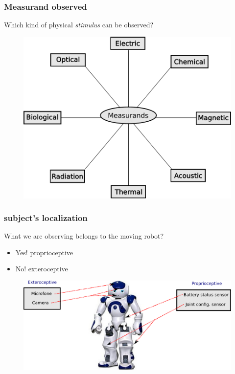 \documentclass{beamer}
\begin{document}
	\begin{frame}
		\frametitle{Measurand observed}
		Which kind of physical \textit{stimulus} can be observed?
		\begin{figure}[h]
			\center
			\includegraphics[scale=0.4]{../img/fig:sensors}
		 \end{figure}				
	\end{frame}
	
	\begin{frame}
		\frametitle{subject's localization}
		What we are observing belongs to the moving robot?
		\begin{itemize}
		\item Yes! proprioceptive
		\item No! exteroceptive
		\end{itemize}
		\begin{figure}[h]
			\center
			\includegraphics[scale=0.51]{img/fig:nao:config}
		 \end{figure}		
	\end{frame}
\end{document}
